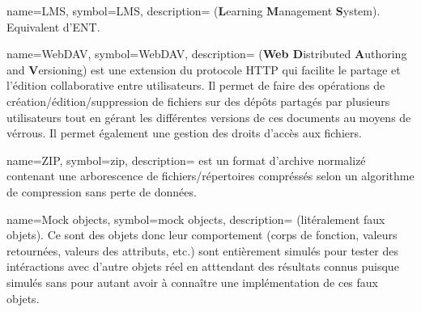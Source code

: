   {
	name=LMS,
	symbol=LMS,
	description={
	  ({\bf L}earning {\bf M}anagement {\bf S}ystem). Equivalent d'ENT.
	}
  }

  {
	name=WebDAV,
	symbol=WebDAV,
	description={
	  ({\bf Web D}istributed {\bf A}uthoring and {\bf V}ersioning) est une
	  extension du protocole HTTP qui facilite le partage et l'édition
	  collaborative entre utilisateurs. Il permet de faire des opérations de
	  création/édition/suppression de fichiers sur des dépôts partagés par
	  plusieurs utilisateurs tout en gérant les différentes versions de ces
	  documents au moyens de vérrous. Il permet également une gestion des droits
	  d'accès aux fichiers.
	}
  }

  {
	name=ZIP,
	symbol=zip,
	description={
	  est un format d'archive normalizé contenant une arborescence de
	  fichiers/répertoires compréssés selon un algorithme de compression sans
	  perte de données.
	}
  }

  {
	name=Mock objects,
	symbol=mock objects,
	description={
	  (litéralement faux objets). Ce sont des objets donc leur comportement
	  (corps de fonction, valeurs retournées, valeurs des attributs, etc.) sont
	  entièrement simulés pour tester des intéractions avec d'autre objets réel
	  en atttendant des résultats connus puisque simulés sans pour autant avoir
	  à connaître une implémentation de ces faux objets.
	}
  }


